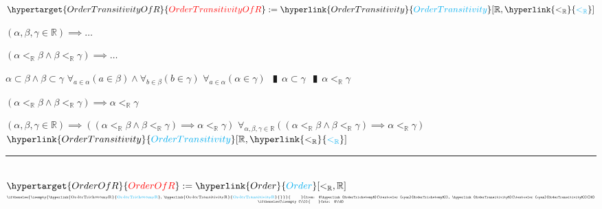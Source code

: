 \documentclass{book}
\newcommand{\df}[1]{\hypertarget{#1}{\textcolor{red}{#1}}}
\newcommand{\rf}[1]{\hyperlink{#1}{\textcolor{cyan}{#1}}}
\newcommand{\abr}{:=}
\newcommand{\pipe}{$\phantom{(}\vrectangleblack\phantom{)}$}
\newcommand{\ann}[2]{%
  \hfill %
  $\stackrel%
  {\hbox{\tiny{\ifthenelse{\isempty{#1}}%
    {\phantom{from}}%
    {from: $#1$}}}}%
  {\hbox{\tiny{\ifthenelse{\isempty{#2}}%
    {\phantom{wts}}%
    {wts: $#2$}}}}$%
\ }
\begin{document}
$\df{OrderTransitivityOfR} \abr \rf{OrderTransitivity}[\mathbb{R}, \rf{<_{\mathbb{R}}}]$
\begin{enumerate}
  \lit $(\alpha, \beta, \gamma \in \mathbb{R}) \implies \ldots$
  \begin{enumerate}
    \lit $(\alpha <_{\mathbb{R}} \beta \land \beta <_{\mathbb{R}} \gamma) \implies \ldots$
    \begin{enumerate}
      \lit $\alpha \subset \beta \land \beta \subset \gamma$
      \lit $\forall_{a \in \alpha}(a \in \beta) \land \forall_{b \in \beta}(b \in \gamma)$
      \lit $\forall_{a \in \alpha}(\alpha \in \gamma)$ \pipe $\alpha \subset \gamma$ \pipe $\alpha <_{\mathbb{R}} \gamma$
    \end{enumerate}
    \lit $(\alpha <_{\mathbb{R}} \beta \land \beta <_{\mathbb{R}} \gamma) \implies \alpha <_{\mathbb{R}} \gamma$    
  \end{enumerate}
  \lit $(\alpha, \beta, \gamma \in \mathbb{R}) \implies ((\alpha <_{\mathbb{R}} \beta \land \beta <_{\mathbb{R}} \gamma) \implies \alpha <_{\mathbb{R}} \gamma)$
  \lit $\forall_{\alpha, \beta, \gamma \in \mathbb{R}}((\alpha <_{\mathbb{R}} \beta \land \beta <_{\mathbb{R}} \gamma) \implies \alpha <_{\mathbb{R}} \gamma)$
  \lit $\rf{OrderTransitivity}[\mathbb{R}, \rf{<_{\mathbb{R}}}]$
\end{enumerate} \vspace{.75mm} \hrule \vspace{.75mm} \ \\

$\df{OrderOfR} \abr \rf{Order}[<_{\mathbb{R}}, \mathbb{R}]$    \ann{\rf{OrderTrichotomyR}, \rf{OrderTransitivityR}{}} \\
\end{document}
